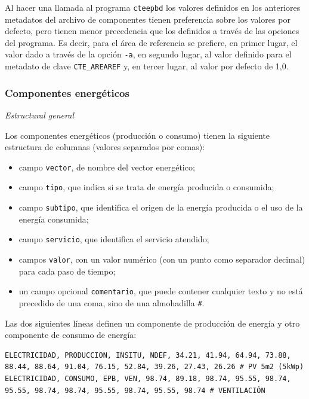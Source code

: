 \documentclass[10pt,notitlepage,oneside,a4paper]{article}
\begin{document}
Al hacer una llamada al programa \texttt{cteepbd} los valores definidos en los anteriores metadatos del archivo de componentes tienen preferencia sobre los valores por defecto, pero tienen menor precedencia que los definidos a través de las opciones del programa. Es decir, para el área de referencia se prefiere, en primer lugar, el valor dado a través de la opción \texttt{-a}, en segundo lugar, al valor definido para el metadato de clave \texttt{CTE\_AREAREF} y, en tercer lugar, al valor por defecto de 1,0.

\subsubsection{Componentes energéticos}\label{sec:componentesenergeticos}

\textit{Estructural general}

Los componentes energéticos (producción o consumo) tienen la siguiente estructura de columnas (valores separados por comas):

\begin{itemize}
\item campo \texttt{vector}, de nombre del vector energético;
\item campo \texttt{tipo}, que indica si se trata de energía producida o consumida;
\item campo \texttt{subtipo}, que identifica el origen de la energía producida o el uso de la energía consumida;
\item campo \texttt{servicio}, que identifica el servicio atendido;
\item campos \texttt{valor}, con un valor numérico (con un punto como separador decimal) para cada paso de tiempo;
\item un campo opcional \texttt{comentario}, que puede contener cualquier texto y no está precedido de una coma, sino de una almohadilla \texttt{\#}.
\end{itemize}

Las dos siguientes líneas definen un componente de producción de energía y otro componente de consumo de energía:

\begin{lstlisting}
ELECTRICIDAD, PRODUCCION, INSITU, NDEF, 34.21, 41.94, 64.94, 73.88, 88.44, 88.64, 91.04, 76.15, 52.84, 39.26, 27.43, 26.26 # PV 5m2 (5kWp)
ELECTRICIDAD, CONSUMO, EPB, VEN, 98.74, 89.18, 98.74, 95.55, 98.74, 95.55, 98.74, 98.74, 95.55, 98.74, 95.55, 98.74 # VENTILACIÓN
\end{lstlisting}
\end{document}
